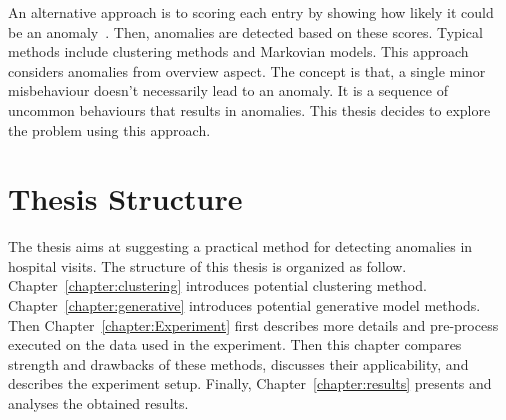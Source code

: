 An alternative approach is to scoring each entry by showing how likely it could be an anomaly~\cite{gupta2014outlier}. Then, anomalies are detected based on these scores. Typical methods include clustering methods and Markovian models. This approach considers anomalies from overview aspect. The concept is that, a single minor misbehaviour doesn't necessarily lead to an anomaly. It is a sequence of uncommon behaviours that results in anomalies. This thesis decides to explore the problem using this approach.

\section{Thesis Structure}
The thesis aims at suggesting a practical method for detecting anomalies in hospital visits. The structure of this thesis is organized as follow. Chapter~\ref{chapter:clustering} introduces potential clustering method. Chapter~\ref{chapter:generative} introduces potential generative model methods. Then Chapter~\ref{chapter:Experiment} first describes more details and pre-process executed on the data used in the experiment. Then this chapter compares strength and drawbacks of these methods, discusses their applicability, and describes the experiment setup. Finally, Chapter~\ref{chapter:results} presents and analyses the obtained results.